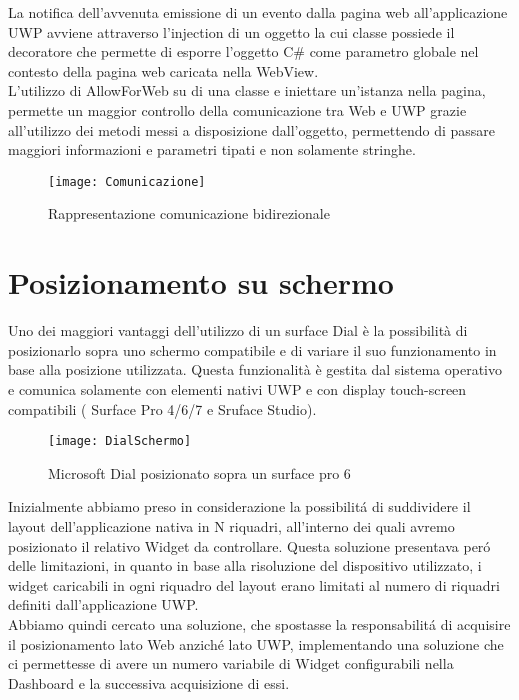 La notifica dell'avvenuta emissione di un evento dalla pagina web all'applicazione UWP avviene attraverso l'injection di un oggetto la cui classe possiede il decoratore \emph{\@AllowForWeb} che permette di esporre l'oggetto C\# come parametro globale nel contesto della pagina web caricata nella WebView.\\

L'utilizzo di AllowForWeb\cite{afw} su di una classe e iniettare un'istanza nella pagina, permette un maggior controllo della comunicazione tra Web e UWP grazie all'utilizzo dei metodi messi a disposizione dall'oggetto, permettendo di passare maggiori informazioni e parametri tipati e non solamente stringhe.
\begin{figure}[htpb!]
  \centering
  \texttt{[image: Comunicazione]}
  \caption{Rappresentazione comunicazione bidirezionale}
\end{figure}

\newpage
\section{Posizionamento su schermo}

Uno dei maggiori vantaggi dell’utilizzo di un surface Dial è la possibilità di posizionarlo sopra uno schermo compatibile e di variare il suo funzionamento in base alla posizione utilizzata.
Questa funzionalità è gestita dal sistema operativo e comunica solamente con elementi nativi UWP e con  display touch-screen compatibili ( Surface Pro 4/6/7 e Sruface Studio).

\begin{figure}[htpb!]
  \centering
  \texttt{[image: DialSchermo]}
  \caption{Microsoft Dial posizionato sopra un surface pro 6}
\end{figure}
Inizialmente abbiamo preso in considerazione la possibilitá di suddividere il layout dell’applicazione nativa in N riquadri, all’interno dei quali avremo posizionato il relativo Widget da controllare. Questa soluzione presentava peró delle limitazioni, in quanto in base alla risoluzione del dispositivo utilizzato, i widget caricabili in ogni riquadro del layout erano limitati al numero di riquadri definiti dall'applicazione UWP.\\
Abbiamo quindi cercato una soluzione, che spostasse la responsabilitá di acquisire il posizionamento lato Web anziché lato UWP, implementando una soluzione che ci permettesse di avere un numero variabile di Widget configurabili nella Dashboard e la successiva acquisizione di essi.\\


